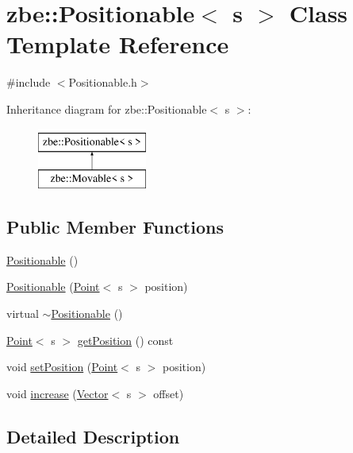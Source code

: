 \hypertarget{classzbe_1_1_positionable}{}\section{zbe\+:\+:Positionable$<$ s $>$ Class Template Reference}
\label{classzbe_1_1_positionable}


{\ttfamily \#include $<$Positionable.\+h$>$}

Inheritance diagram for zbe\+:\+:Positionable$<$ s $>$\+:\begin{figure}[H]
\begin{center}
\leavevmode
\includegraphics[height=2.000000cm]{classzbe_1_1_positionable}
\end{center}
\end{figure}
\subsection*{Public Member Functions}
\begin{DoxyCompactItemize}
\item 
\hyperlink{classzbe_1_1_positionable_a9fcb779fb35cc4d559177f240952aad8}{Positionable} ()
\item 
\hyperlink{classzbe_1_1_positionable_a6a11960f1a8d50a4f957908da1ea32a4}{Positionable} (\hyperlink{classzbe_1_1_point}{Point}$<$ s $>$ position)
\item 
virtual \hyperlink{classzbe_1_1_positionable_a8fbe13fe4d3ce705b3456f69222fb3b3}{$\sim$\+Positionable} ()
\item 
\hyperlink{classzbe_1_1_point}{Point}$<$ s $>$ \hyperlink{classzbe_1_1_positionable_abbce038018b1fe7d5c751334600f7287}{get\+Position} () const 
\item 
void \hyperlink{classzbe_1_1_positionable_a7667edc885aacd9c7f602f4e259c4ca5}{set\+Position} (\hyperlink{classzbe_1_1_point}{Point}$<$ s $>$ position)
\item 
void \hyperlink{classzbe_1_1_positionable_a728be26695a102a8c6b53142ab4509ef}{increase} (\hyperlink{classzbe_1_1_vector}{Vector}$<$ s $>$ offset)
\end{DoxyCompactItemize}


\subsection{Detailed Description}
